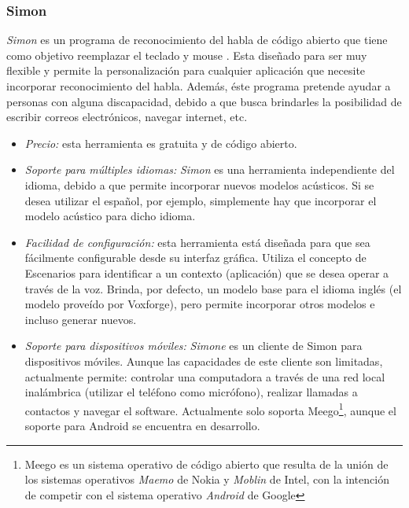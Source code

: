 \subsubsection{Simon}
\label{sec:simon}

\emph{Simon} es un programa de reconocimiento del habla de c\'odigo abierto que tiene como objetivo
reemplazar el teclado y mouse \cite{SimonListen}. Esta dise\~nado para ser muy flexible y permite la
personalizaci\'on para cualquier aplicaci\'on que necesite incorporar reconocimiento
del habla. Adem\'as, \'este programa pretende ayudar a personas con alguna discapacidad, debido
a que busca brindarles la posibilidad de escribir correos electr\'onicos, navegar internet, etc.

\begin{itemize}
    \item \emph{Precio:} esta herramienta es gratuita y de c\'odigo abierto.
    \item \emph{Soporte para m\'ultiples idiomas:} \emph{Simon} es una herramienta independiente del idioma,
	debido a que permite incorporar nuevos modelos ac\'usticos. Si se desea
	utilizar el espa\~nol, por ejemplo, simplemente hay que incorporar el modelo ac\'ustico
	para dicho idioma.
    \item \emph{Facilidad de configuraci\'on:} esta herramienta est\'a dise\~nada para que sea
	f\'acilmente configurable desde su interfaz gr\'afica. Utiliza el concepto de Escenarios para identificar a un contexto (aplicaci\'on)
	que se desea operar a trav\'es de la voz. Brinda, por defecto, un modelo base para el idioma ingl\'es (el
	modelo prove\'ido por Voxforge), pero permite incorporar otros modelos e incluso generar nuevos.
    \item \emph{Soporte para dispositivos m\'oviles:} \emph{Simone} es un cliente de Simon para dispositivos m\'oviles. Aunque las
	capacidades de este cliente son limitadas, actualmente permite: controlar una computadora a trav\'es de una red
	local inal\'ambrica (utilizar el tel\'efono como micr\'ofono), realizar llamadas a contactos y navegar el software. Actualmente
	solo soporta Meego\footnote{Meego es un sistema operativo de c\'odigo abierto que resulta de la uni\'on de
	los sistemas operativos \emph{Maemo} de Nokia y \emph{Moblin} de Intel, con la intenci\'on de competir
	con el sistema operativo \emph{Android} de Google}, aunque el soporte para Android se encuentra en desarrollo.

\end{itemize}
